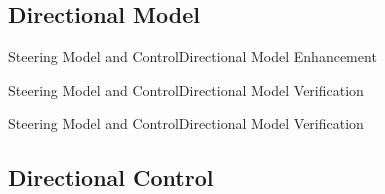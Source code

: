 \subsection{Directional Model}
\begin{frame}{Steering Model and Control}{Directional Model Enhancement}

    \begin{figure}[H]
    \centering
  \end{figure}
\end{frame}
\begin{frame}{Steering Model and Control}{Directional Model Verification}

    \begin{figure}[H]
    \centering
  \end{figure}
\end{frame}
\begin{frame}{Steering Model and Control}{Directional Model Verification}

    \begin{figure}[H]
    \centering
  \end{figure}
\end{frame}


\subsection{Directional Control}


